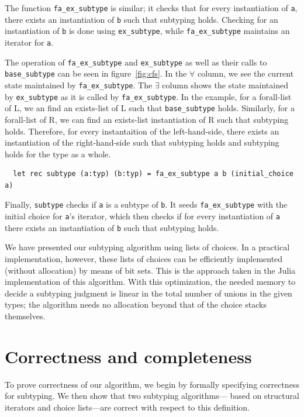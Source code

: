 \documentclass[a4paper,english]{lipics-v2019}
\begin{document}
The function \verb|fa_ex_subtype| is similar; it checks that for every
instantiation of \verb|a|, there exists an instantiation of 
\verb|b| such that subtyping holds. Checking for an instantiation
of \verb|b| is done using \verb|ex_subtype|, while \verb|fa_ex_subtype|
maintains an iterator for \verb|a|.

The operation of \verb|fa_ex_subtype| and \verb|ex_subtype| as well as their
calls to \verb|base_subtype| can be seen in figure~\ref{fig:cfs}. In the
$\forall$ column, we see the current state maintained by \verb|fa_ex_subtype|.
The $\exists$ column shows the state maintained by \verb|ex_subtype| as it is
called by \verb|fa_ex_subtype|. In the example, for a forall-list of L, we an
find an exists-list of L such that \verb|base_subtype| holds. Similarly,
for a forall-list of R, we can find an exists-list instantiation of R such
that subtyping holds. Therefore, for every instantaition of the left-hand-side,
there exists an instantiation of the right-hand-side such that subtyping holds
and subtyping holds for the type as a whole.


\begin{small}
\begin{verbatim}
  let rec subtype (a:typ) (b:typ) = fa_ex_subtype a b (initial_choice a)
\end{verbatim}
\end{small}

Finally, \verb|subtype| checks if \verb|a| is a subtype of \verb|b|.
It seeds \verb|fa_ex_subtype| with the initial choice for \verb|a|'s
iterator, which then checks if for every instantiation of \verb|a|
there exists an instantiation of \verb|b| such that subtyping holds.

We have presented our subtyping algorithm using lists of choices. In a
practical implementation, however, these lists of choices can be efficiently
implemented (without allocation) by means of bit sets. This is the approach
taken in the Julia implementation of this algorithm. With this optimization,
the needed memory to decide a subtyping judgment is linear in the total number
of unions in the given types; the algorithm needs no allocation beyond that
of the choice stacks themselves.

\section{Correctness and completeness}

To prove correctness of our algorithm, we begin by formally specifying
correctness for subtyping. We then show that two subtyping algorithms---
based on structural iterators and choice lists---are correct
with respect to this definition.
\end{document}
